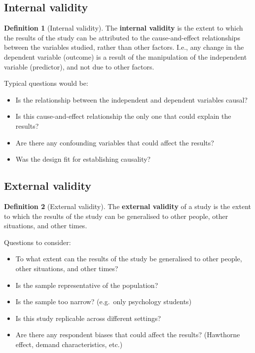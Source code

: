\documentclass[
  11pt,
]{book}
\providecommand{\tightlist}{%
  \setlength{\itemsep}{0pt}\setlength{\parskip}{0pt}}
\theoremstyle{definition}
\newtheorem{definition}{Definition}[chapter]
\theoremstyle{definition}
\theoremstyle{definition}
\theoremstyle{definition}
\theoremstyle{remark}
\begin{document}
\hypertarget{internal-validity}{%
\subsection{Internal validity}\label{internal-validity}}

\begin{definition}[Internal validity]
\protect\hypertarget{def:definternalvalidity}{}\label{def:definternalvalidity}The \textbf{internal validity} is the extent to which the results of the study can be attributed to the cause-and-effect relationships between the variables studied, rather than other factors. I.e., any change in the dependent variable (outcome) is a result of the manipulation of the independent variable (predictor), and not due to other factors.
\end{definition}

Typical questions would be:

\begin{itemize}
\tightlist
\item
  Is the relationship between the independent and dependent variables causal?
\item
  Is this cause-and-effect relationship the only one that could explain the results?
\item
  Are there any confounding variables that could affect the results?
\item
  Was the design fit for establishing causality?
\end{itemize}

\hypertarget{external-validity}{%
\subsection{External validity}\label{external-validity}}

\begin{definition}[External validity]
\protect\hypertarget{def:defexternalvalidity}{}\label{def:defexternalvalidity}The \textbf{external validity} of a study is the extent to which the results of the study can be generalised to other people, other situations, and other times.
\end{definition}

Questions to consider:

\begin{itemize}
\tightlist
\item
  To what extent can the results of the study be generalised to other people, other situations, and other times?
\item
  Is the sample representative of the population?
\item
  Is the sample too narrow? (e.g.~only psychology students)
\item
  Is this study replicable across different settings?
\item
  Are there any respondent biases that could affect the results? (Hawthorne effect, demand characteristics, etc.)
\end{itemize}
\end{document}
